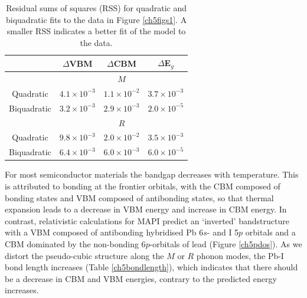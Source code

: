 \begin{table}[ht] \centering
 \caption[Residual sum of squares for quadratic and bi-quadratic fits to the bandgap] {Residual sums of squares (RSS) for quadratic and biquadratic fits to the data in Figure \ref{ch5figs1}. A smaller RSS indicates a better fit of the model to the data.}
  \label{RSS} 
 \begin{tabular}{cccc} 
 \toprule
 
  \multicolumn{1}{c}{} & $\Delta$VBM & $\Delta$CBM & $\Delta$E$_g$ \\
  \midrule
 \multicolumn{1}{c}{} & \multicolumn{3}{c}{$M$} \\

 Quadratic & $4.1 \times 10^{-3}$ & $ 1.1 \times 10^{-2}$ & $3.7 \times 10^{-3}$ \\

 Biquadratic & $3.2 \times 10^{-3}$ & $2.9 \times 10^{-3}$ & $2.0 \times 10^{-5}$ \\

 \midrule
 
  \multicolumn{1}{c}{} & \multicolumn{3}{c}{$R$} \\

 Quadratic &   $9.8 \times 10^{-3}$& $2.0 \times 10^{-2}$& $3.5 \times 10^{-3}$\\

 Biquadratic & $6.4 \times 10^{-3}$ &$6.0 \times 10^{-3}$ & $6.0 \times 10^{-5}$\\
 
 \bottomrule
 \end{tabular}
 \end{table}

For most semiconductor materials the bandgap decreases with temperature. This is attributed to bonding at the frontier orbitals, with the CBM composed of bonding states and VBM composed of antibonding states, so that thermal expansion leads to a decrease in VBM energy and increase in CBM energy.\autocite{Francisco2019}
In contrast, relativistic calculations for MAPI predict an `inverted' bandstructure with a VBM composed of antibonding hybridised Pb 6$s$- and I 5$p$ orbitals and a CBM dominated by the non-bonding 6$p$-orbitals of lead (Figure \ref{ch5pdos}).\autocite{Brivio2013}
As we distort the pseudo-cubic structure along the $M$ or $R$ phonon modes, the Pb-I bond length increases (Table \ref{ch5bondlength}), which indicates that there should be a decrease in CBM and VBM energies, contrary to the predicted energy increases.

